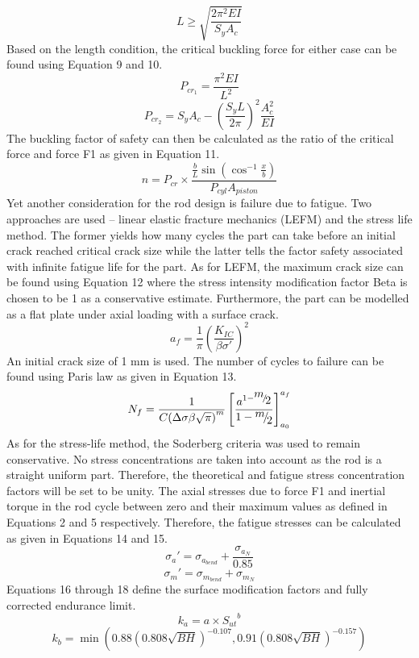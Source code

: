 \documentclass[10pt,a4paper]{article}
\begin{document}
\[L \ge \sqrt {\frac{{2{\pi ^2}EI}}{{{S_y}{A_c}}}} \]
Based on the length condition, the critical buckling force for either case can be found using Equation 9 and 10.
\[{P_{c{r_1}}} = \frac{{{\pi ^2}EI}}{{{L^2}}}\]
\[{P_{c{r_2}}} = {S_y}{A_c} - {\left( {\frac{{{S_y}L}}{{2\pi }}} \right)^2}\frac{{A_c^2}}{{EI}}\]
The buckling factor of safety can then be calculated as the ratio of the critical force and force F1 as given in Equation 11.
\[n = {P_{cr}} \times \frac{{\frac{b}{L}\sin ({{\cos }^{ - 1}}\frac{x}{b})}}{{{P_{cyl}}{A_{piston}}}}\]
Yet another consideration for the rod design is failure due to fatigue. Two approaches are used – linear elastic fracture mechanics (LEFM) and the stress life method. The former yields how many cycles the part can take before an initial crack reached critical crack size while the latter tells the factor safety associated with infinite fatigue life for the part.
As for LEFM, the maximum crack size can be found using Equation 12 where the stress intensity modification factor Beta is chosen to be 1 as a conservative estimate. Furthermore, the part can be modelled as a flat plate under axial loading with a surface crack.
\[{a_f} = \frac{1}{\pi }{\left( {\frac{{{K_{IC}}}}{{\beta \sigma '}}} \right)^2}\]
An initial crack size of 1 mm is used. The number of cycles to failure can be found using Paris law as given in Equation 13.
\[{N_f} = \frac{1}{{C{{\left( {\Delta \sigma \beta \sqrt \pi  } \right)}^m}}}\left[ {\frac{{{a^{1 - {\raise0.7ex\hbox{$m$} \!\mathord{\left/
 {\vphantom {m 2}}\right.\kern-\nulldelimiterspace}
\!\lower0.7ex\hbox{$2$}}}}}}{{1 - {\raise0.7ex\hbox{$m$} \!\mathord{\left/
 {\vphantom {m 2}}\right.\kern-\nulldelimiterspace}
\!\lower0.7ex\hbox{$2$}}}}} \right]_{{a_0}}^{{a_f}}\]
As for the stress-life method, the Soderberg criteria was used to remain conservative. No stress concentrations are taken into account as the rod is a straight uniform part. Therefore, the theoretical and fatigue stress concentration factors will be set to be unity. The axial stresses due to force F1 and inertial torque in the rod cycle between zero and their maximum values as defined in Equations 2 and 5 respectively. Therefore, the fatigue stresses can be calculated as given in Equations 14 and 15.
\[{\sigma _a}' = {\sigma _{{a_{bend}}}} + \frac{{{\sigma _{{a_N}}}}}{{0.85}}\]
\[{\sigma _m}' = {\sigma _{{m_{bend}}}} + {\sigma _{{m_N}}}\]
Equations 16 through 18 define the surface modification factors and fully corrected endurance limit.
\[{k_a} = a \times {S_{ut}}^b\]
\[{k_b} = \min \left( {0.88{{\left( {0.808\sqrt {BH} } \right)}^{ - 0.107}},0.91{{\left( {0.808\sqrt {BH} } \right)}^{ - 0.157}}} \right)\]
\end{document}
